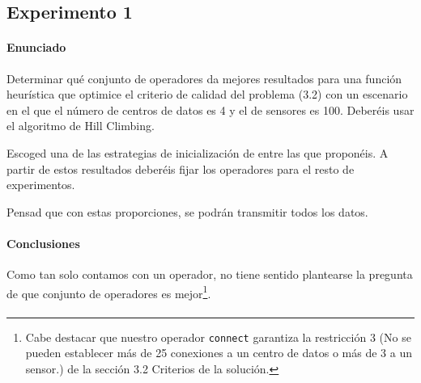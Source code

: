 \subsection{Experimento 1}

\paragraph{Enunciado}

Determinar qué conjunto de operadores da mejores resultados para una función 
heurística que optimice el criterio de calidad del problema (3.2) con un 
escenario en el que el número de centros de datos es 4
y el de sensores es 100. Deberéis usar el algoritmo de Hill Climbing. 

Escoged una de las estrategias de inicialización de entre las que proponéis. 
A partir de estos resultados deberéis fijar los operadores para
el resto de experimentos.

Pensad que con estas proporciones, se podrán transmitir todos los datos.

\paragraph{Conclusiones}

Como tan solo contamos con un operador, no tiene sentido plantearse la pregunta
de que conjunto de operadores es mejor\footnote{
  Cabe destacar que nuestro operador \texttt{connect} garantiza la
  restricción 3 (No se pueden establecer más de 25 conexiones a un 
  centro de datos o más de 3 a un sensor.) de la sección 3.2 Criterios
  de la solución.
}. 

\paragraph{}

